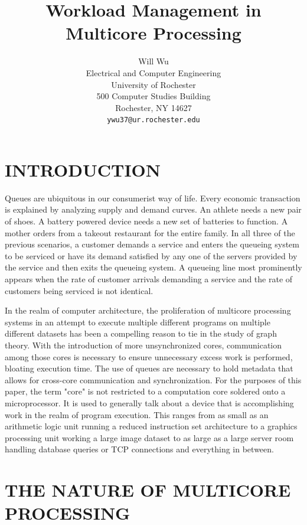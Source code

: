 \documentclass[letterpaper, 10 pt, conference]{ieeeconf}
\title{\LARGE \bf
Workload  Management  in  Multicore  Processing 
}
\author{ \parbox{3 in}{\centering Will Wu\\
        Electrical and Computer Engineering\\
        University of Rochester\\
        500 Computer Studies Building \\
        Rochester, NY 14627\\
        {\tt\small ywu37@ur.rochester.edu}}
}
\begin{document}
\maketitle
\thispagestyle{empty}
\pagestyle{empty}



\section{INTRODUCTION}

Queues are ubiquitous in our consumerist way of life.  Every economic transaction is explained by analyzing supply and demand curves.  An athlete needs a new pair of shoes.  A battery powered device needs a new set of batteries to function.  A mother orders from a takeout restaurant for the entire family.  In all three of the previous scenarios, a customer demands a service and enters the queueing system to be serviced or have its demand satisfied by any one of the servers provided by the service and then exits the queueing system.  A queueing line most prominently appears when the rate of customer arrivals demanding a service and the rate of customers being serviced is not identical.

In the realm of computer architecture, the proliferation of multicore processing systems in an attempt to execute multiple different programs on multiple different datasets has been a compelling reason to tie in the study of graph theory. With the introduction of more unsynchronized cores, communication among those cores is necessary to ensure unnecessary excess work is performed, bloating execution time.  The use of queues are necessary to hold metadata that allows for cross-core communication and synchronization.  For the purposes of this paper, the term "core" is not restricted to a computation core soldered onto a microprocessor.  It is used to generally talk about a device that is accomplishing work in the realm of program execution.  This ranges from as small as an arithmetic logic unit running a reduced instruction set architecture to a graphics processing unit working a large image dataset to as large as a large server room handling database queries or TCP connections and everything in between.

\section{THE NATURE OF MULTICORE PROCESSING}
\end{document}
